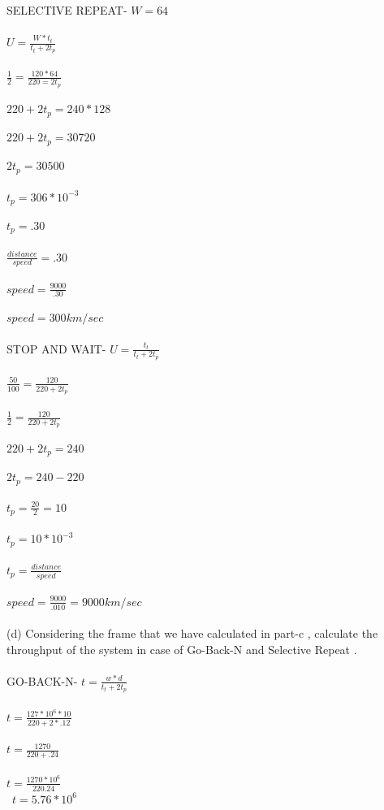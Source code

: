 \documentclass[a4paper,8pt]{article}
\begin{document}
SELECTIVE REPEAT-
$W=64$\\\\
$U=\frac{W*t_{t}}{t_{t}+2t_{p}}$\\\\
$\frac{1}{2}=\frac{120*64}{220=2t_{p}}$\\\\
$220+2t_{p}=240*128$\\\\
$220+2t_{p}=30720$\\\\
$2t_{p}=30500$\\\\
$t_{p}=306*10^{-3}$\\\\
$t_{p}=.30$\\\\
$\frac{distance}{speed}=.30$\\\\
$speed=\frac{9000}{.30}$\\\\
$speed=300 km/sec$\\\\

STOP AND WAIT-
$U=\frac{t_{t}}{t_{t}+2t_{p}}$\\\\
$\frac{50}{100}=\frac{120}{220+2t_{p}}$\\\\
$\frac{1}{2}=\frac{120}{220+2t_{p}}$\\\\
$220+2t_{p}=240$\\\\
$2t_{p}=240-220$\\\\
$t_{p}=\frac{20}{2}=10$\\\\
$t_{p}=10*10^{-3}$\\\\
$t_{p}=\frac{distance}{speed}$\\\\
$speed=\frac{9000}{.010}=9000 km/sec$\\\\
(d) Considering the frame that we have calculated in part-c , calculate the throughput
of the system in case of Go-Back-N and Selective Repeat .\\\\

GO-BACK-N-
$t=\frac{w*d}{t_{t}+2t_{p}}$\\\\
$t=\frac{127*10^{6}*10}{220+2*.12}$\\\\
$t=\frac{1270}{220+.24}$\\\\
$t=\frac{1270*10^{6}}{220.24}$\\\
$t=5.76*10^{6}$\\\
\end{document}
